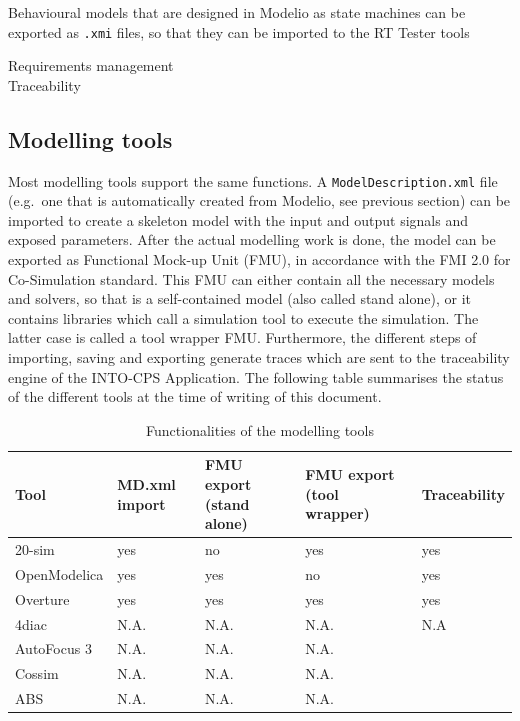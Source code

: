 Behavioural models that are designed in Modelio as state machines can be exported as \texttt{.xmi} files, so that they can be imported to the RT Tester tools

Requirements management\\
Traceability\\

\subsection{Modelling tools}

Most modelling tools support the same functions. A \texttt{ModelDescription.xml} file (e.g.\ one that is automatically created from Modelio, see previous section) can be imported to create a skeleton model with the input and output signals and exposed parameters. After the actual modelling work is done, the model can be exported as Functional Mock-up Unit (FMU), in accordance with the FMI 2.0 for Co-Simulation standard. This FMU can either contain all the necessary models and solvers, so that is a self-contained model (also called stand alone), or it contains libraries which call a simulation tool to execute the simulation. The latter case is called a tool wrapper FMU. Furthermore, the different steps of importing, saving and exporting generate traces which are sent to the traceability engine of the INTO-CPS Application. The following table summarises the status of the different tools at the time of writing of this document.

\begin{table}[ht]
	\centering
		\begin{tabular}{l|p{2.5cm}|p{2.5cm}|p{2.5cm}|p{2.5cm}}
			Tool & MD.xml import & FMU export (stand alone) & FMU export (tool wrapper) & Traceability\\
			\hline
			20-sim & yes & no & yes & yes\\
			OpenModelica & yes & yes & no & yes\\
			Overture & yes & yes & yes & yes\\
			4diac & N.A. & N.A. & N.A. & N.A \\
			AutoFocus 3 & N.A. & N.A. & N.A. \\
			Cossim & N.A. & N.A. & N.A. \\
			ABS & N.A. & N.A. & N.A. \\
		\end{tabular}
	\caption{Functionalities of the modelling tools}
	\label{tab:FunctionalitiesOfTheModelingTools}
\end{table}

